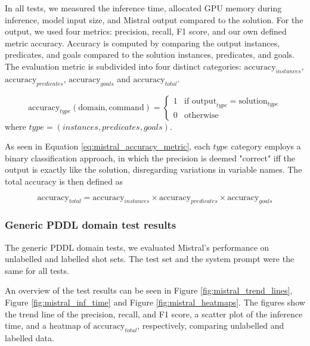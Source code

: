 In all tests, we measured the inference time, allocated GPU memory during inference, model input size, and Mistral output compared to the solution. For the output, we used four metrics: precision, recall, F1 score, and our own defined metric accuracy. Accuracy is computed by comparing the output instances, predicates, and goals compared to the solution instances, predicates, and goals. The evaluation metric is subdivided
into four distinct categories: $\text{accuracy}_{instances}$, $\text{accuracy}_{predicates}$, $\text{accuracy}_{goals}$ and $\text{accuracy}_{total}$.

\begin{equation}\label{eq:mistral_accuracy_metric}
    \text{accuracy}_{type}(\text{domain}, \text{command})=
    \begin{cases}
        1 & \text{if } \text{output}_{type} = \text{solution}_{type} \\
        0 & \text{otherwise}
    \end{cases}
\end{equation}
where $type = (instances, predicates, goals)$.

As seen in Equation \ref{eq:mistral_accuracy_metric}, each $type$ category employs a binary classification approach, in which the precision is deemed "correct" iff the output is exactly like the solution, disregarding variations in variable names. The total accuracy is then defined as

\begin{equation}\label{eq:mistral_total_accuracy_metric}
    \text{accuracy}_{total}=\text{accuracy}_{instances}\times \text{accuracy}_{predicates}\times \text{accuracy}_{goals}
\end{equation}

\subsubsection{Generic PDDL domain test results}
The generic PDDL domain tests, we evaluated Mistral's performance on unlabelled and labelled shot sets. The test set and the system prompt were the same for all tests.

An overview of the test results can be seen in Figure \ref{fig:mistral_trend_lines}, Figure \ref{fig:mistral_inf_time} and Figure \ref{fig:mistral_heatmaps}. The figures show the trend line of the precision, recall, and F1 score, a scatter plot of the inference time, and a heatmap of $\text{accuracy}_{total}$, respectively, comparing unlabelled and labelled data.

